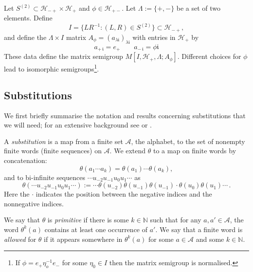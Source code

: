 \documentclass[10pt,a4paper]{amsart}
\numberwithin{equation}{section}
\newcommand{\N}{\mathbb N}
\newcommand{\tcb}{\textcolor{blue}}
\newcommand{\ii}{{\mathfrak i}}
\newcommand{\Aa}{{\mathcal A}}
\newcommand{\Hh}{{\mathcal H}}
\begin{document}
Let $S^{(2)}\subset \Hh_{-+}\times \Hh_{+}$ and $\phi\in \Hh_{+-}$. Let $\Lambda := \{+,-\}$ be a set of two elements. Define
\begin{equation}\label{eq:r-set}I = \{LR^{-1}:(L,R) \in S^{(2)}\}\subset \Hh_{-+},\end{equation}
and  define the $\Lambda\times I$ matrix $A_\phi=(a_{\lambda \ii})_{\lambda \ii}$ with entries in $\Hh_+$ by 
\begin{equation}\label{eq:matrix} a_{+\,\ii} = e_+ \qquad a_{-\,\ii} = \phi \ii \end{equation}
These data define the matrix semigroup $M[I,\Hh_{+},\Lambda;A_\phi]$. 
Different choices for $\phi$ lead to isomorphic semigroups\footnote{If $\phi=e_+\eta_o^{-1} e_-$ for some $\eta_0\in I$ then the matrix semigroup is normalised.}.


\subsection{Substitutions}\label{sec:substitutions}

We first briefly summarise the notation and results concerning substitutions that we will need; for an extensive background see \cite{Baake-Grimm} or \cite{Pytheas-Fogg}.


A  {\em substitution} is a map from a finite set $\mathcal A$, the alphabet, to the set of 
nonempty finite words (finite sequences) on $\mathcal A$. We extend $\theta$ to a map on finite words by concatenation: 
\begin{equation}\label{eq-concat}\theta(a_1\cdots a_k) = \theta(a_1)\cdots \theta(a_k),
\end{equation}
and to bi-infinite sequences $\cdots u_{-2} u_{-1} u_0 u_1 \cdots$  as  
\[\theta   (\cdots u_{-2} u_{-1} u_0 u_1 \cdots ) :=   \cdots \theta (u_{-2}) \theta (  u_{-1}    ) \theta  (u_{-1})\cdot   \theta (     u_{0})  \theta (    u_{1}) \cdots \, .\]
Here the $\cdot$ indicates the position between the negative indices and the nonnegative indices. 

We say that $\theta$ is {\em primitive} if there is some 
$k\in \N$ such that for any $a,a'\in \mathcal A$,
the word $\theta^k(a)$ contains at least one  occurrence of $a'$. 
We say that a finite word is {\em allowed} for $\theta$ if it appears somewhere in $\theta^k(a)$ for some $a\in \Aa$ and some  $k\in\N$. 
\end{document}
